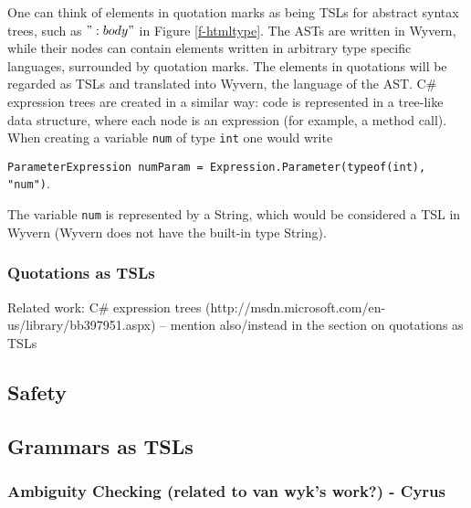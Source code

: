 One can think of elements in quotation marks as being TSLs for abstract syntax trees, such as $":body"$ in Figure \ref{f-htmltype}. The ASTs are written in Wyvern, while their nodes can contain elements written in arbitrary type specific languages, surrounded by quotation marks. The elements in quotations will be regarded as TSLs and translated into Wyvern, the language of the AST. C\# expression trees \cite{Csharp} are created in a similar way: code is represented in a tree-like data structure, where each node is an expression (for example, a method call). When creating a variable \lstinline{num} of type \lstinline{int} one would write

 \lstinline{ParameterExpression numParam = Expression.Parameter(typeof(int), "num")}.

 The variable \lstinline{num} is represented by a String, which would be considered a TSL in Wyvern (Wyvern does not have the built-in type String).

\subsubsection{Quotations as TSLs}
Related work: C\# expression trees (http://msdn.microsoft.com/en-us/library/bb397951.aspx) -- mention also/instead in the section on quotations as TSLs

\subsection{Safety}
\subsection{Grammars as TSLs}
\subsubsection{Ambiguity Checking (related to van wyk's work?) - Cyrus}

